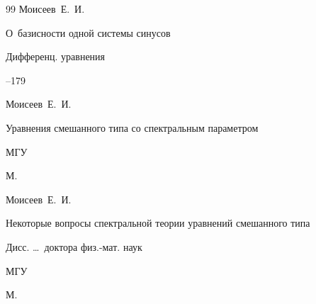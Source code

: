 \begin{thebibliography}{99}
\by Моисеев~Е.~И.

\paper О~базисности одной системы синусов

\jour Дифференц. уравнения




--179









\by Моисеев~Е.~И.

\book Уравнения смешанного типа со спектральным параметром


\publ МГУ

\publaddr М.















\by Моисеев~Е.~И.

\thesis Некоторые вопросы спектральной теории уравнений смешанного типа

\thesisinfo Дисс. \dots\ доктора физ.-мат. наук


\publ МГУ

\publaddr М.







\end{thebibliography}
